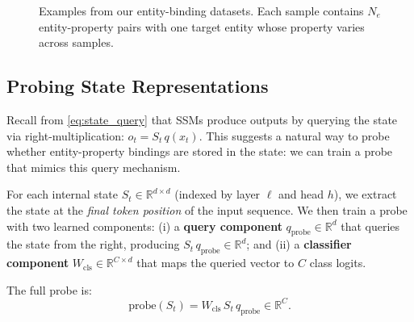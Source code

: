 \documentclass[11pt]{article}
\begin{document}
\begin{figure}[t]
\centering
\small
{}

\vspace{0.5em}

\caption{Examples from our entity-binding datasets. Each sample contains $N_e$ entity-property pairs with one target entity whose property varies across samples.}
\label{fig:dataset_examples}
\end{figure}

\subsection{Probing State Representations}
\label{sec:probing}

Recall from \cref{eq:state_query} that SSMs produce outputs by querying the state via right-multiplication: $o_t = S_t \, q(x_t)$. This suggests a natural way to probe whether entity-property bindings are stored in the state: we can train a probe that mimics this query mechanism.

For each internal state $S_t \in \mathbb{R}^{d \times d}$ (indexed by layer $\ell$ and head $h$), we extract the state at the \emph{final token position} of the input sequence. We then train a probe with two learned components: (i) a \textbf{query component} $q_{\text{probe}} \in \mathbb{R}^{d}$ that queries the state from the right, producing $S_t \, q_{\text{probe}} \in \mathbb{R}^{d}$; and (ii) a \textbf{classifier component} $W_{\text{cls}} \in \mathbb{R}^{C \times d}$ that maps the queried vector to $C$ class logits.

The full probe is:
\begin{equation}
    \text{probe}(S_t) = W_{\text{cls}} \, S_t \, q_{\text{probe}} \in \mathbb{R}^{C}.
    \label{eq:probe}
\end{equation}
\end{document}
